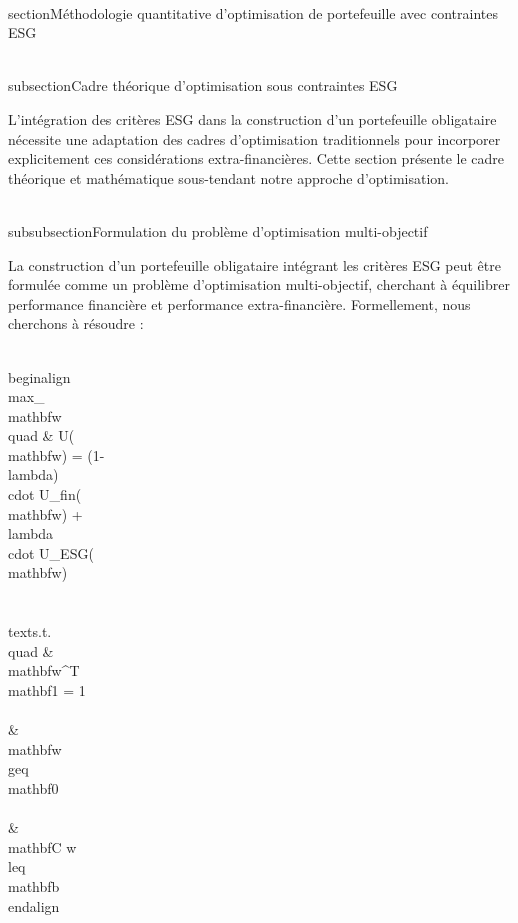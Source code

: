 \\section{Méthodologie quantitative d'optimisation de portefeuille avec contraintes ESG}

\\subsection{Cadre théorique d'optimisation sous contraintes ESG}

L'intégration des critères ESG dans la construction d'un portefeuille obligataire nécessite une adaptation des cadres d'optimisation traditionnels pour incorporer explicitement ces considérations extra-financières. Cette section présente le cadre théorique et mathématique sous-tendant notre approche d'optimisation.

\\subsubsection{Formulation du problème d'optimisation multi-objectif}

La construction d'un portefeuille obligataire intégrant les critères ESG peut être formulée comme un problème d'optimisation multi-objectif, cherchant à équilibrer performance financière et performance extra-financière. Formellement, nous cherchons à résoudre :

\\begin{align}
\\max_{\\mathbf{w}} \\quad & U(\\mathbf{w}) = (1-\\lambda) \\cdot U_{fin}(\\mathbf{w}) + \\lambda \\cdot U_{ESG}(\\mathbf{w}) \\\\
\\text{s.t.} \\quad & \\mathbf{w}^T \\mathbf{1} = 1 \\\\
& \\mathbf{w} \\geq \\mathbf{0} \\\\
& \\mathbf{C w} \\leq \\mathbf{b}
\\end{align}

